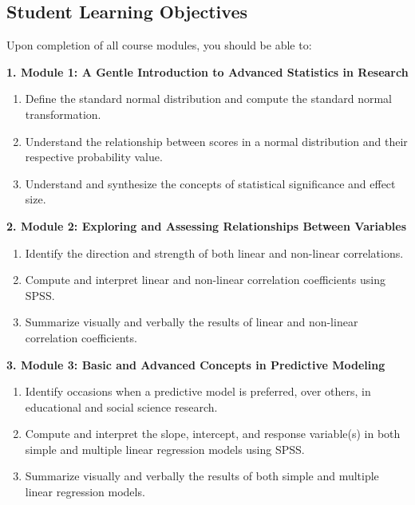 \documentclass[
]{article}
\providecommand{\tightlist}{%
  \setlength{\itemsep}{0pt}\setlength{\parskip}{0pt}}
\begin{document}
\subsection{Student Learning Objectives}

Upon completion of all course modules, you should be able to:

\textbf{1. Module 1: A Gentle Introduction to Advanced Statistics in
Research}

\begin{enumerate}
\def\labelenumi{\arabic{enumi}.}
\tightlist
\item
  Define the standard normal distribution and compute the standard
  normal transformation.
\item
  Understand the relationship between scores in a normal distribution
  and their respective probability value.
\item
  Understand and synthesize the concepts of statistical significance and
  effect size.
\end{enumerate}

\textbf{2. Module 2: Exploring and Assessing Relationships Between
Variables}

\begin{enumerate}
\def\labelenumi{\arabic{enumi}.}
\tightlist
\item
  Identify the direction and strength of both linear and non-linear
  correlations.
\item
  Compute and interpret linear and non-linear correlation coefficients
  using SPSS.
\item
  Summarize visually and verbally the results of linear and non-linear
  correlation coefficients.
\end{enumerate}

\textbf{3. Module 3: Basic and Advanced Concepts in Predictive Modeling}

\begin{enumerate}
\def\labelenumi{\arabic{enumi}.}
\tightlist
\item
  Identify occasions when a predictive model is preferred, over others,
  in educational and social science research.
\item
  Compute and interpret the slope, intercept, and response variable(s)
  in both simple and multiple linear regression models using SPSS.
\item
  Summarize visually and verbally the results of both simple and
  multiple linear regression models.
\end{enumerate}
\end{document}
